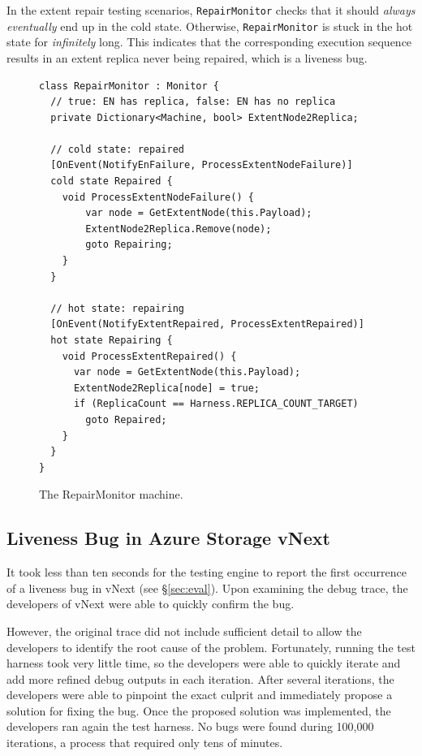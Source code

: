 In the extent repair testing scenarios, \texttt{RepairMonitor} checks that it should \emph{always eventually} end up in the cold state. Otherwise, \texttt{RepairMonitor} is stuck in the hot state for \emph{infinitely} long. This indicates that the corresponding execution sequence results in an extent replica never being repaired, which is a liveness bug.

\begin{figure}[t]
\begin{lstlisting}
class RepairMonitor : Monitor {
  // true: EN has replica, false: EN has no replica
  private Dictionary<Machine, bool> ExtentNode2Replica;

  // cold state: repaired
  [OnEvent(NotifyEnFailure, ProcessExtentNodeFailure)]
  cold state Repaired {
    void ProcessExtentNodeFailure() {
        var node = GetExtentNode(this.Payload);
        ExtentNode2Replica.Remove(node);
        goto Repairing;
    }
  }

  // hot state: repairing
  [OnEvent(NotifyExtentRepaired, ProcessExtentRepaired)]
  hot state Repairing {
    void ProcessExtentRepaired() {
      var node = GetExtentNode(this.Payload);
      ExtentNode2Replica[node] = true;
      if (ReplicaCount == Harness.REPLICA_COUNT_TARGET)
        goto Repaired;
    }
  }
}
\end{lstlisting}
\vspace{-2mm}
\caption{The RepairMonitor machine.}
\label{fig:monitor}
\end{figure}

\subsection{Liveness Bug in Azure Storage vNext}
\label{sec:method:azurestore}

It took less than ten seconds for the \psharp testing engine to report the first occurrence of a liveness bug in vNext (see \S\ref{sec:eval}). Upon examining the debug trace, the developers of vNext were able to quickly confirm the bug.

However, the original \psharp trace did not include sufficient detail to allow the developers to identify the root cause of the problem. Fortunately, running the test harness took very little time, so the developers were able to quickly iterate and add more refined debug outputs in each iteration. After several iterations, the developers were able to pinpoint the exact culprit and immediately propose a solution for fixing the bug. Once the proposed solution was implemented, the developers ran again the test harness. No bugs were found during 100,000 iterations, a process that required only tens of minutes.

